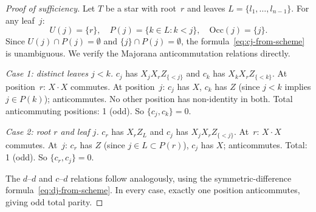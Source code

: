 \begin{proof}[Proof of sufficiency]
Let $T$ be a star with root~$r$ and leaves $L = \{l_1, \ldots,
l_{n-1}\}$.  For any leaf~$j$:
\[
  U(j) = \{r\}, \quad
  P(j) = \{k \in L : k < j\}, \quad
  \mathrm{Occ}(j) = \{j\}.
\]
Since $U(j) \cap P(j) = \emptyset$ and $\{j\} \cap P(j) = \emptyset$,
the formula~\eqref{eq:cj-from-scheme} is unambiguous.  We verify the
Majorana anticommutation relations directly.

\emph{Case 1: distinct leaves $j < k$.}
$c_j$ has $X_j X_r Z_{\{<j\}}$ and $c_k$ has $X_k X_r Z_{\{<k\}}$.
At position~$r$: $X \cdot X$ commutes.  At position~$j$: $c_j$ has
$X$, $c_k$ has $Z$ (since $j < k$ implies $j \in P(k)$);
anticommutes.  No other position has non-identity in both.  Total
anticommuting positions: 1 (odd).  So $\{c_j, c_k\} = 0$.

\emph{Case 2: root $r$ and leaf $j$.}
$c_r$ has $X_r Z_L$ and $c_j$ has $X_j X_r Z_{\{<j\}}$.
At~$r$: $X \cdot X$ commutes.  At~$j$: $c_r$ has $Z$ (since
$j \in L \subset P(r)$), $c_j$ has $X$; anticommutes.  Total: 1
(odd).  So $\{c_r, c_j\} = 0$.

The $d$--$d$ and $c$--$d$ relations follow analogously, using the
symmetric-difference formula~\eqref{eq:dj-from-scheme}.  In every
case, exactly one position anticommutes, giving odd total parity.
\end{proof}

